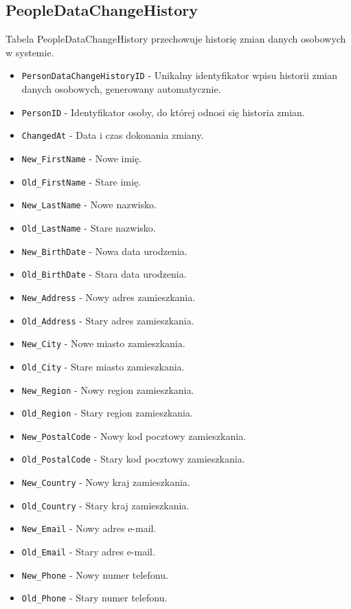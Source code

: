 \documentclass[11pt]{article}
\begin{document}
\subsection{PeopleDataChangeHistory}
\label{sec:orgb96d8b7}
Tabela PeopleDataChangeHistory przechowuje historię zmian danych osobowych w systemie.
\begin{itemize}
\item \texttt{PersonDataChangeHistoryID} - Unikalny identyfikator wpisu historii zmian danych osobowych, generowany automatycznie.
\item \texttt{PersonID} - Identyfikator osoby, do której odnosi się historia zmian.
\item \texttt{ChangedAt} - Data i czas dokonania zmiany.
\item \texttt{New\_FirstName} - Nowe imię.
\item \texttt{Old\_FirstName} - Stare imię.
\item \texttt{New\_LastName} - Nowe nazwisko.
\item \texttt{Old\_LastName} - Stare nazwisko.
\item \texttt{New\_BirthDate} - Nowa data urodzenia.
\item \texttt{Old\_BirthDate} - Stara data urodzenia.
\item \texttt{New\_Address} - Nowy adres zamieszkania.
\item \texttt{Old\_Address} - Stary adres zamieszkania.
\item \texttt{New\_City} - Nowe miasto zamieszkania.
\item \texttt{Old\_City} - Stare miasto zamieszkania.
\item \texttt{New\_Region} - Nowy region zamieszkania.
\item \texttt{Old\_Region} - Stary region zamieszkania.
\item \texttt{New\_PostalCode} - Nowy kod pocztowy zamieszkania.
\item \texttt{Old\_PostalCode} - Stary kod pocztowy zamieszkania.
\item \texttt{New\_Country} - Nowy kraj zamieszkania.
\item \texttt{Old\_Country} - Stary kraj zamieszkania.
\item \texttt{New\_Email} - Nowy adres e-mail.
\item \texttt{Old\_Email} - Stary adres e-mail.
\item \texttt{New\_Phone} - Nowy numer telefonu.
\item \texttt{Old\_Phone} - Stary numer telefonu.
\end{itemize}
\end{document}
